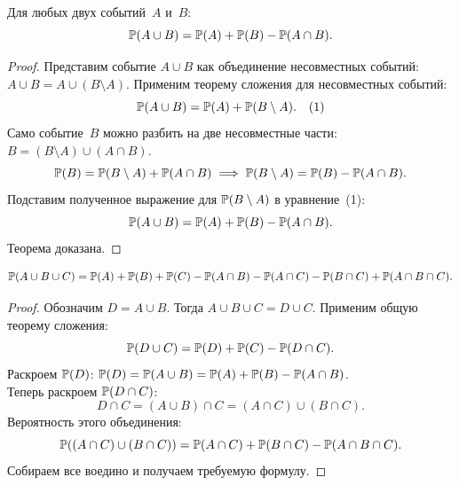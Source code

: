 \begin{theorem}
Для любых двух событий~$A$ и~$B$:
\[
\mathbb{P}(A \cup B) = \mathbb{P}(A) + \mathbb{P}(B) - \mathbb{P}(A \cap B).
\]
\end{theorem}

\begin{proof}
Представим событие $A \cup B$ как объединение несовместных событий: $A \cup B = A \cup (B \setminus A)$.
Применим теорему сложения для несовместных событий:
\[
\mathbb{P}(A \cup B) = \mathbb{P}(A) + \mathbb{P}(B \setminus A). \quad (1)
\]
Само событие~$B$ можно разбить на две несовместные части: $B = (B \setminus A) \cup (A \cap B)$.
\[
\mathbb{P}(B) = \mathbb{P}(B \setminus A) + \mathbb{P}(A \cap B) \implies \mathbb{P}(B \setminus A) = \mathbb{P}(B) - \mathbb{P}(A \cap B).
\]
Подставим полученное выражение для $\mathbb{P}(B \setminus A)$ в уравнение~(1):
\[
\mathbb{P}(A \cup B) = \mathbb{P}(A) + \mathbb{P}(B) - \mathbb{P}(A \cap B).
\]
Теорема доказана.
\end{proof}

\begin{theorem}
\[
\mathbb{P}(A \cup B \cup C) = \mathbb{P}(A) + \mathbb{P}(B) + \mathbb{P}(C) - \mathbb{P}(A \cap B) - \mathbb{P}(A \cap C) - \mathbb{P}(B \cap C) + \mathbb{P}(A \cap B \cap C).
\]
\end{theorem}

\begin{proof}
Обозначим $D = A \cup B$. Тогда $A \cup B \cup C = D \cup C$. Применим общую теорему сложения:
\[
\mathbb{P}(D \cup C) = \mathbb{P}(D) + \mathbb{P}(C) - \mathbb{P}(D \cap C).
\]
Раскроем $\mathbb{P}(D)$: $\mathbb{P}(D) = \mathbb{P}(A \cup B) = \mathbb{P}(A) + \mathbb{P}(B) - \mathbb{P}(A \cap B)$. \\
Теперь раскроем $\mathbb{P}(D \cap C)$:
\[
D \cap C = (A \cup B) \cap C = (A \cap C) \cup (B \cap C).
\]
Вероятность этого объединения:
\[
\mathbb{P}((A \cap C) \cup (B \cap C)) = \mathbb{P}(A \cap C) + \mathbb{P}(B \cap C) - \mathbb{P}(A \cap B \cap C).
\]
Собираем все воедино и получаем требуемую формулу.
\end{proof}